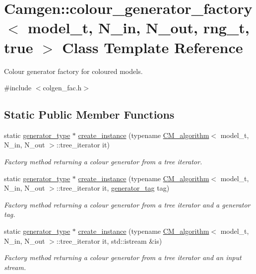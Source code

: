 \hypertarget{a00087}{\section{Camgen\-:\-:colour\-\_\-generator\-\_\-factory$<$ model\-\_\-t, N\-\_\-in, N\-\_\-out, rng\-\_\-t, true $>$ Class Template Reference}
\label{a00087}
}


Colour generator factory for coloured models.  




{\ttfamily \#include $<$colgen\-\_\-fac.\-h$>$}

\subsection*{Static Public Member Functions}
\begin{DoxyCompactItemize}
\item 
static \hyperlink{a00082}{generator\-\_\-type} $\ast$ \hyperlink{a00087_a7dc260df3cf7e839fbcb349213bf606a}{create\-\_\-instance} (typename \hyperlink{a00070}{C\-M\-\_\-algorithm}$<$ model\-\_\-t, N\-\_\-in, N\-\_\-out $>$\-::tree\-\_\-iterator it)
\begin{DoxyCompactList}\small\item\em Factory method returning a colour generator from a tree iterator. \end{DoxyCompactList}\item 
static \hyperlink{a00082}{generator\-\_\-type} $\ast$ \hyperlink{a00087_aa2198a11d2d45183af9a239369d5d54c}{create\-\_\-instance} (typename \hyperlink{a00070}{C\-M\-\_\-algorithm}$<$ model\-\_\-t, N\-\_\-in, N\-\_\-out $>$\-::tree\-\_\-iterator it, \hyperlink{a00088_af5ebbb0f77f0cac3c4959f2a880a2f1c}{generator\-\_\-tag} tag)
\begin{DoxyCompactList}\small\item\em Factory method returning a colour generator from a tree iterator and a generator tag. \end{DoxyCompactList}\item 
static \hyperlink{a00082}{generator\-\_\-type} $\ast$ \hyperlink{a00087_a2d10e45adadf65b9706b7d4254227657}{create\-\_\-instance} (typename \hyperlink{a00070}{C\-M\-\_\-algorithm}$<$ model\-\_\-t, N\-\_\-in, N\-\_\-out $>$\-::tree\-\_\-iterator it, std\-::istream \&is)
\begin{DoxyCompactList}\small\item\em Factory method returning a colour generator from a tree iterator and an input stream. \end{DoxyCompactList}\end{DoxyCompactItemize}


